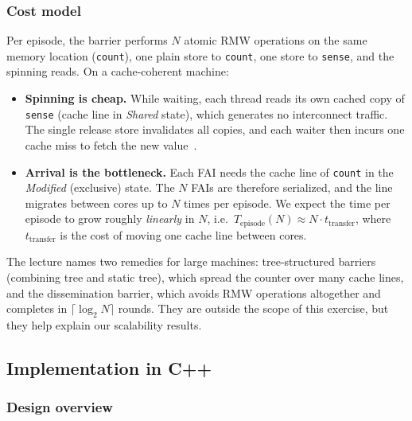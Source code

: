\subsubsection{Cost model}
\label{sec:ex2-costmodel}

Per episode, the barrier performs $N$ atomic RMW operations on the same
memory location (\texttt{count}), one plain store to \texttt{count}, one
store to \texttt{sense}, and the spinning reads. On a cache-coherent
machine:

\begin{itemize}
    \item \textbf{Spinning is cheap.} While waiting, each thread reads its
          own cached copy of \texttt{sense} (cache line in \emph{Shared}
          state), which generates no interconnect traffic. The single
          release store invalidates all copies, and each waiter then incurs
          one cache miss to fetch the new value~\cite{lecture04,sorin2020}.
    \item \textbf{Arrival is the bottleneck.} Each FAI needs the cache line
          of \texttt{count} in the \emph{Modified} (exclusive) state. The
          $N$ FAIs are therefore serialized, and the line migrates between
          cores up to $N$ times per episode. We expect the time per episode
          to grow roughly \emph{linearly} in $N$, i.e.\
          $T_{\text{episode}}(N) \approx N \cdot t_{\text{transfer}}$, where
          $t_{\text{transfer}}$ is the cost of moving one cache line between
          cores.
\end{itemize}

The lecture names two remedies for large machines: tree-structured
barriers (combining tree and static tree), which spread the counter over
many cache lines, and the dissemination barrier, which avoids RMW operations
altogether and completes in $\lceil \log_2 N\rceil$ rounds. They are outside
the scope of this exercise, but they help explain our scalability results.

\subsection{Implementation in C++}
\label{sec:ex2-impl}

\subsubsection{Design overview}

